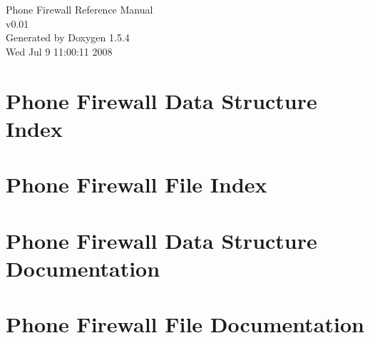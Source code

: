 \documentclass[a4paper]{book}
\begin{document}
\begin{titlepage}
\vspace*{7cm}
\begin{center}
{\Large Phone Firewall Reference Manual\\[1ex]\large v0.01 }\\
\vspace*{1cm}
{\large Generated by Doxygen 1.5.4}\\
\vspace*{0.5cm}
{\small Wed Jul 9 11:00:11 2008}\\
\end{center}
\end{titlepage}
\clearemptydoublepage
{}
\tableofcontents
\clearemptydoublepage
{}
\chapter{Phone Firewall Data Structure Index}

\chapter{Phone Firewall File Index}

\chapter{Phone Firewall Data Structure Documentation}


\chapter{Phone Firewall File Documentation}







\printindex
\end{document}
